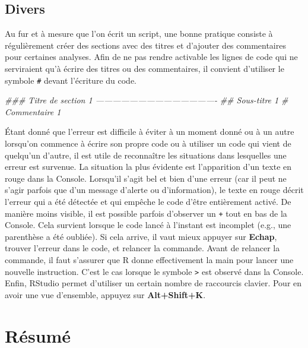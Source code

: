 \documentclass[
  french,
]{book}
\newenvironment{Shaded}{\begin{snugshade}}{\end{snugshade}}
\newcommand{\CommentTok}[1]{\textcolor[rgb]{0.56,0.35,0.01}{\textit{#1}}}
\begin{document}
\hypertarget{divers}{%
\subsection{Divers}\label{divers}}

Au fur et à mesure que l'on écrit un script, une bonne pratique consiste à régulièrement créer des sections avec des titres et d'ajouter des commentaires pour certaines analyses. Afin de ne pas rendre activable les lignes de code qui ne serviraient qu'à écrire des titres ou des commentaires, il convient d'utiliser le symbole \texttt{\#} devant l'écriture du code.

\begin{Shaded}
\begin{Highlighting}[]
\CommentTok{### Titre de section 1 -------------------------------------------}
\CommentTok{## Sous-titre 1}
  \CommentTok{# Commentaire 1}
\end{Highlighting}
\end{Shaded}

Étant donné que l'erreur est difficile à éviter à un moment donné ou à un autre lorsqu'on commence à écrire son propre code ou à utiliser un code qui vient de quelqu'un d'autre, il est utile de reconnaître les situations dans lesquelles une erreur est survenue. La situation la plus évidente est l'apparition d'un texte en rouge dans la Console. Lorsqu'il s'agit bel et bien d'une erreur (car il peut ne s'agir parfois que d'un message d'alerte ou d'information), le texte en rouge décrit l'erreur qui a été détectée et qui empêche le code d'être entièrement activé. De manière moins visible, il est possible parfois d'observer un \texttt{+} tout en bas de la Console. Cela survient lorsque le code lancé à l'instant est incomplet (e.g., une parenthèse a été oubliée). Si cela arrive, il vaut mieux appuyer sur \textbf{Echap}, trouver l'erreur dans le code, et relancer la commande. Avant de relancer la commande, il faut s'assurer que R donne effectivement la main pour lancer une nouvelle instruction. C'est le cas lorsque le symbole \texttt{\textgreater{}} est observé dans la Console. Enfin, RStudio permet d'utiliser un certain nombre de raccourcis clavier. Pour en avoir une vue d'ensemble, appuyez sur \textbf{Alt+Shift+K}.

\hypertarget{ruxe9sumuxe9}{%
\section{Résumé}\label{ruxe9sumuxe9}}
\end{document}
